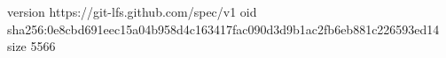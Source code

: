 version https://git-lfs.github.com/spec/v1
oid sha256:0e8cbd691eec15a04b958d4c163417fac090d3d9b1ac2fb6eb881c226593ed14
size 5566
